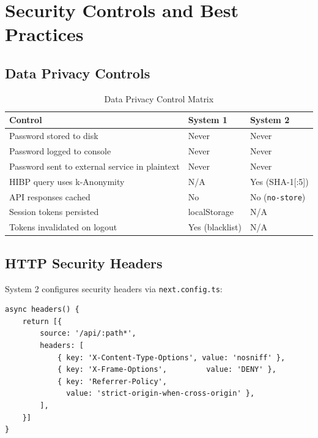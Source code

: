 \documentclass[12pt,a4paper]{article}
\begin{document}
\section{Security Controls and Best Practices}

\subsection{Data Privacy Controls}

\begin{table}[H]
\centering
\begin{tabular}{lll}
\toprule
\textbf{Control} & \textbf{System 1} & \textbf{System 2} \\
\midrule
Password stored to disk        & Never & Never \\
Password logged to console     & Never & Never \\
Password sent to external service in plaintext & Never & Never \\
HIBP query uses k-Anonymity    & N/A   & Yes (SHA-1[:5]) \\
API responses cached           & No    & No (\texttt{no-store}) \\
Session tokens persisted       & localStorage & N/A \\
Tokens invalidated on logout   & Yes (blacklist) & N/A \\
\bottomrule
\end{tabular}
\caption{Data Privacy Control Matrix}
\end{table}

\subsection{HTTP Security Headers}

System 2 configures security headers via \texttt{next.config.ts}:

\begin{lstlisting}[style=tsstyle, caption={Security Headers (next.config.ts)}]
async headers() {
    return [{
        source: '/api/:path*',
        headers: [
            { key: 'X-Content-Type-Options', value: 'nosniff' },
            { key: 'X-Frame-Options',         value: 'DENY' },
            { key: 'Referrer-Policy',
              value: 'strict-origin-when-cross-origin' },
        ],
    }]
}
\end{lstlisting}
\end{document}
